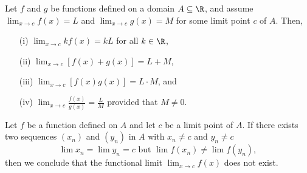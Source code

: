 \begin{tcolorbox}
    \begin{cor}
    Let \( f \) and \( g \) be functions defined on a domain \( A \subseteq \R  \), and assume \( \lim_{ x \to c } f(x) = L  \) and \( \lim_{ x \to c } g(x) = M  \) for some limit point \( c \) of \( A  \). Then, 
    \begin{enumerate}
        \item[(i)] \( \lim_{ x \to c } kf(x) = kL  \) for all \( k \in \R  \),
        \item[(ii)] \( \lim_{ x \to c } [f(x) + g(x)] = L + M, \)
        \item[(iii)] \( \lim_{ x \to c } [f(x)g(x)] = L \cdot M  \), and 
        \item[(iv)] \( \lim_{ x \to c } \frac{ f(x) }{ g(x)  } = \frac{ L }{ M }  \) provided that \( M \neq  0 \).
    \end{enumerate}
    \end{cor}
\end{tcolorbox}


\begin{tcolorbox}
    \begin{cor}
    Let \( f \) be a function defined on \( A  \) and let \( c  \) be a limit point of \( A  \). If there exists two sequences \( (x_n) \) and \( (y_n) \) in \( A  \) with \( x_n \neq  c \) and \( y_n \neq c  \) 
    \[  \lim x_n = \lim y_n = c \text{~but~} \lim f(x_n) \neq \lim f(y_n),  \]
    then we conclude that the functional limit \( \lim_{x \to c } f(x)  \) does not exist.
    \end{cor}
\end{tcolorbox}
